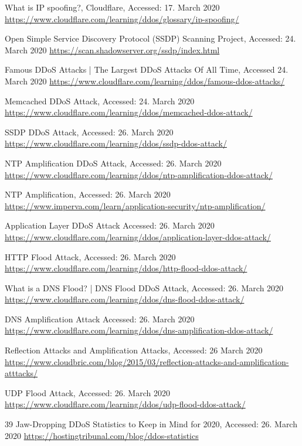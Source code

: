 \begin{thebibliography}{99}
 What is IP spoofing?, Cloudflare, Accessed: 17. March 2020 \url{https://www.cloudflare.com/learning/ddos/glossary/ip-spoofing/}

 Open Simple Service Discovery Protocol (SSDP) Scanning Project, Accessed: 24. March 2020 \url{https://scan.shadowserver.org/ssdp/index.html}

 Famous DDoS Attacks | The Largest DDoS Attacks Of All Time, Accessed 24. March 2020 \url{https://www.cloudflare.com/learning/ddos/famous-ddos-attacks/}

 Memcached DDoS Attack, Accessed: 24. March 2020 \url{https://www.cloudflare.com/learning/ddos/memcached-ddos-attack/}

 SSDP DDoS Attack, Accessed: 26. March 2020 \url{https://www.cloudflare.com/learning/ddos/ssdp-ddos-attack/}

 NTP Amplification DDoS Attack, Accessed: 26. March 2020 \url{https://www.cloudflare.com/learning/ddos/ntp-amplification-ddos-attack/}

 NTP Amplification, Accessed: 26. March 2020 \url{https://www.imperva.com/learn/application-security/ntp-amplification/}

Application Layer DDoS Attack Accessed: 26. March 2020 \url{https://www.cloudflare.com/learning/ddos/application-layer-ddos-attack/}

 HTTP Flood Attack, Accessed: 26. March 2020 \url{https://www.cloudflare.com/learning/ddos/http-flood-ddos-attack/}

 What is a DNS Flood? | DNS Flood DDoS Attack, Accessed: 26. March 2020 \url{https://www.cloudflare.com/learning/ddos/dns-flood-ddos-attack/}

 DNS Amplification Attack Accessed: 26. March 2020 \url{https://www.cloudflare.com/learning/ddos/dns-amplification-ddos-attack/}

 Reflection Attacks and Amplification Attacks, Accessed: 26 March 2020 \url{https://www.cloudbric.com/blog/2015/03/reflection-attacks-and-amplification-atttacks/}

 UDP Flood Attack, Accessed: 26. March 2020 \url{https://www.cloudflare.com/learning/ddos/udp-flood-ddos-attack/}

 39 Jaw-Dropping DDoS Statistics to Keep in Mind for 2020, Accessed: 26. March 2020 \url{https://hostingtribunal.com/blog/ddos-statistics}


\end{thebibliography}
